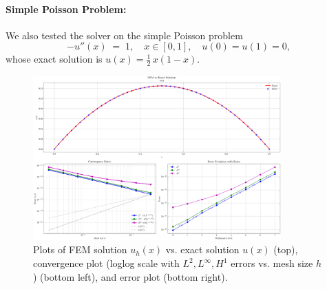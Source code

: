 \documentclass[a4paper,10pt]{article}
\begin{document}
\paragraph{Simple Poisson Problem:}
We also tested the solver on the simple Poisson problem
\[
	-u''(x) \;=\; 1, \quad x \in [0,1], \quad u(0)=u(1)=0,
\]
whose exact solution is \(u(x) = \tfrac12\,x(1-x)\).

\begin{figure}[H]
	\centering
	\includegraphics[width=0.85\textwidth]{figures/convergence_simple.png}
	\caption{Plots of FEM solution \(u_h(x)\) vs. exact solution \(u(x)\) (top),
		convergence plot (loglog scale with $L^2, L^\infty, H^1$ errors vs. mesh size $h$) (bottom left),
		and error plot (bottom right).}
	\label{fig:solution_simple}
\end{figure}
\end{document}
